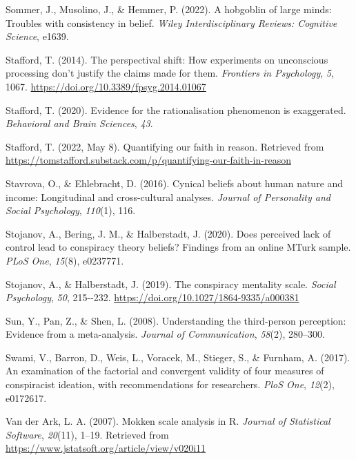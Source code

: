 \documentclass[
  ,jou,floatsintext]{apa6}
\newlength{\cslhangindent}
\newlength{\cslentryspacingunit} %
\newenvironment{CSLReferences}[2] %
 {%
  \setlength{\parindent}{0pt}
  \ifodd #1
  \let\oldpar\par
  \def\par{\hangindent=\cslhangindent\oldpar}
  \fi
  \setlength{\parskip}{#2\cslentryspacingunit}
 }%
 {}
\begin{document}
\begin{CSLReferences}{1}{0}
\leavevmode{}%
Sommer, J., Musolino, J., \& Hemmer, P. (2022). A hobgoblin of large minds: Troubles with consistency in belief. \emph{Wiley Interdisciplinary Reviews: Cognitive Science}, e1639.

\leavevmode{}%
Stafford, T. (2014). The perspectival shift: How experiments on unconscious processing don't justify the claims made for them. \emph{Frontiers in Psychology}, \emph{5}, 1067. \url{https://doi.org/10.3389/fpsyg.2014.01067}

\leavevmode{}%
Stafford, T. (2020). Evidence for the rationalisation phenomenon is exaggerated. \emph{Behavioral and Brain Sciences}, \emph{43}.

\leavevmode{}%
Stafford, T. (2022, May 8). Quantifying our faith in reason. Retrieved from \url{https://tomstafford.substack.com/p/quantifying-our-faith-in-reason}

\leavevmode{}%
Stavrova, O., \& Ehlebracht, D. (2016). Cynical beliefs about human nature and income: Longitudinal and cross-cultural analyses. \emph{Journal of Personality and Social Psychology}, \emph{110}(1), 116.

\leavevmode{}%
Stojanov, A., Bering, J. M., \& Halberstadt, J. (2020). Does perceived lack of control lead to conspiracy theory beliefs? Findings from an online MTurk sample. \emph{PLoS One}, \emph{15}(8), e0237771.

\leavevmode{}%
Stojanov, A., \& Halberstadt, J. (2019). The conspiracy mentality scale. \emph{Social Psychology}, \emph{50}, 215-\/-232. \url{https://doi.org/10.1027/1864-9335/a000381}

\leavevmode{}%
Sun, Y., Pan, Z., \& Shen, L. (2008). Understanding the third-person perception: Evidence from a meta-analysis. \emph{Journal of Communication}, \emph{58}(2), 280--300.

\leavevmode{}%
Swami, V., Barron, D., Weis, L., Voracek, M., Stieger, S., \& Furnham, A. (2017). An examination of the factorial and convergent validity of four measures of conspiracist ideation, with recommendations for researchers. \emph{PloS One}, \emph{12}(2), e0172617.

\leavevmode{}%
Van der Ark, L. A. (2007). Mokken scale analysis in {R}. \emph{Journal of Statistical Software}, \emph{20}(11), 1--19. Retrieved from \url{https://www.jstatsoft.org/article/view/v020i11}


\end{CSLReferences}
\end{document}
